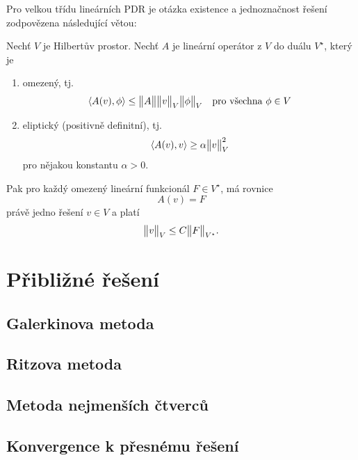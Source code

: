 Pro velkou třídu lineárních PDR je otázka  existence a jednoznačnost řešení zodpovězena následující větou:
\begin{theorem}
Nechť $V$ je Hilbertův prostor.
Nechť $A$ je lineární operátor z $V$ do duálu $V^\star$, který je 
\begin{enumerate}
 \item omezený, tj. 
  \[
     \langle A(v), \phi \rangle \le \bigl\Vert A\bigr\Vert\bigl\Vert v\bigr\Vert_V\bigl\Vert\phi\bigr\Vert_V \quad \text{pro všechna }\phi\in V
  \]
  \item eliptický (positivně definitní), tj.
  \[
     \langle A(v), v \rangle \ge \alpha \bigl\Vert v\bigr\Vert^2_V
  \]
  pro nějakou konstantu $\alpha > 0$.
\end{enumerate}
Pak pro každý omezený lineární funkcionál $F\in V^\star$, má rovnice 
\[
    A(v)=F
\]
právě jedno řešení $v \in V$ a platí
\[
   \bigl\Vert v\bigr\Vert_V \le C \bigl\Vert F\bigr\Vert_{V^\star}.
\]
\end{theorem}


\section{Přibližné řešení}
\subsection{Galerkinova metoda}
\subsection{Ritzova metoda}
\subsection{Metoda nejmenších čtverců}
\subsection{Konvergence k přesnému řešení}

 
























